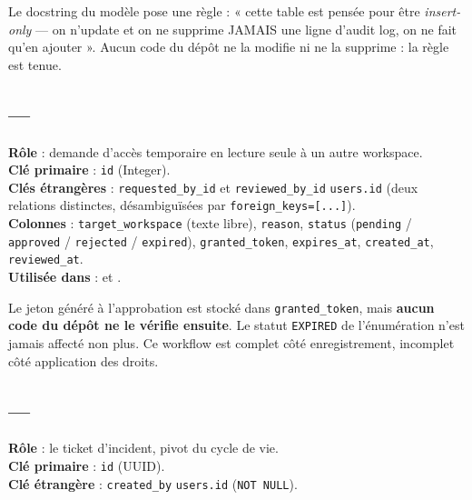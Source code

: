 \begin{keybox}
Le docstring du modèle pose une règle : « cette table est pensée pour être
\emph{insert-only} --- on n'update et on ne supprime JAMAIS une ligne d'audit
log, on ne fait qu'en ajouter ». Aucun code du dépôt ne la modifie ni ne la
supprime : la règle est tenue.
\end{keybox}

\subsection{ --- }

\textbf{Rôle} : demande d'accès temporaire en lecture seule à un autre
workspace.\\
\textbf{Clé primaire} : \texttt{id} (Integer).\\
\textbf{Clés étrangères} : \texttt{requested\_by\_id} et \texttt{reviewed\_by\_id}
\arrowto{} \texttt{users.id} (deux relations distinctes, désambiguïsées par
\texttt{foreign\_keys=[...]}).\\
\textbf{Colonnes} : \texttt{target\_workspace} (texte libre), \texttt{reason},
\texttt{status} (\texttt{pending} / \texttt{approved} / \texttt{rejected} /
\texttt{expired}), \texttt{granted\_token}, \texttt{expires\_at},
\texttt{created\_at}, \texttt{reviewed\_at}.\\
\textbf{Utilisée dans} :  et
.

\begin{warnbox}
Le jeton généré à l'approbation est stocké dans \texttt{granted\_token}, mais
\textbf{aucun code du dépôt ne le vérifie ensuite}. Le statut \texttt{EXPIRED} de
l'énumération n'est jamais affecté non plus. Ce workflow est complet côté
enregistrement, incomplet côté application des droits.
\end{warnbox}

\subsection{ --- }

\textbf{Rôle} : le ticket d'incident, pivot du cycle de vie.\\
\textbf{Clé primaire} : \texttt{id} (UUID).\\
\textbf{Clé étrangère} : \texttt{created\_by} \arrowto{} \texttt{users.id}
(\texttt{NOT NULL}).

